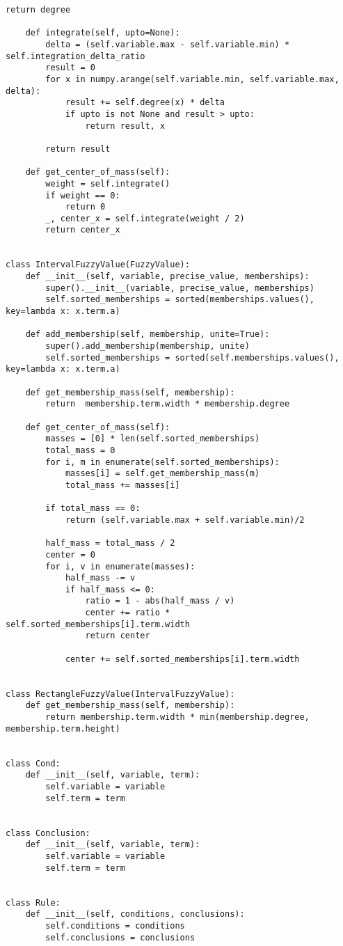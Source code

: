\begin{lstlisting}[style=pythonstyle,caption={ }, label=lst:func:1]
		return degree

	def integrate(self, upto=None):
		delta = (self.variable.max - self.variable.min) * self.integration_delta_ratio
		result = 0
		for x in numpy.arange(self.variable.min, self.variable.max, delta):
			result += self.degree(x) * delta
			if upto is not None and result > upto:
				return result, x

		return result

	def get_center_of_mass(self):
		weight = self.integrate()
		if weight == 0:
			return 0
		_, center_x = self.integrate(weight / 2)
		return center_x


class IntervalFuzzyValue(FuzzyValue):
	def __init__(self, variable, precise_value, memberships):
		super().__init__(variable, precise_value, memberships)
		self.sorted_memberships = sorted(memberships.values(), key=lambda x: x.term.a)

	def add_membership(self, membership, unite=True):
		super().add_membership(membership, unite)
		self.sorted_memberships = sorted(self.memberships.values(), key=lambda x: x.term.a)

	def get_membership_mass(self, membership):
		return  membership.term.width * membership.degree

	def get_center_of_mass(self):
		masses = [0] * len(self.sorted_memberships)
		total_mass = 0
		for i, m in enumerate(self.sorted_memberships):
			masses[i] = self.get_membership_mass(m)
			total_mass += masses[i]

		if total_mass == 0:
			return (self.variable.max + self.variable.min)/2

		half_mass = total_mass / 2
		center = 0
		for i, v in enumerate(masses):
			half_mass -= v
			if half_mass <= 0:
				ratio = 1 - abs(half_mass / v)
				center += ratio * self.sorted_memberships[i].term.width
				return center

			center += self.sorted_memberships[i].term.width


class RectangleFuzzyValue(IntervalFuzzyValue):
	def get_membership_mass(self, membership):
		return membership.term.width * min(membership.degree, membership.term.height)


class Cond:
	def __init__(self, variable, term):
		self.variable = variable
		self.term = term


class Conclusion:
	def __init__(self, variable, term):
		self.variable = variable
		self.term = term


class Rule:
	def __init__(self, conditions, conclusions):
		self.conditions = conditions
		self.conclusions = conclusions



\end{lstlisting}
